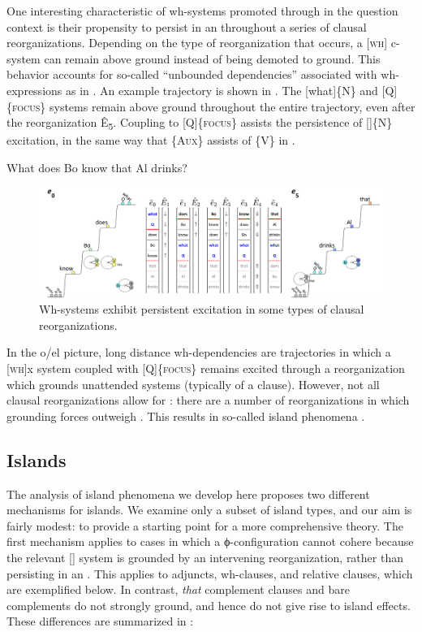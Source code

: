   One interesting characteristic of wh-systems promoted through  in the question context is their propensity to persist in an  throughout a series of clausal reorganizations. Depending on the type of reorganization that occurs, a [\textsc{wh}] c-system can remain above ground instead of being demoted to ground. This behavior accounts for so-called “unbounded dependencies” associated with wh-expressions as in . An example trajectory is shown in {}. The [what]\{N\} and [Q]\{\textsc{focus}\} systems remain above ground throughout the entire trajectory, even after the  reorganization Ê\textsubscript{5}. Coupling to [Q]\{\textsc{focus}\} assists the persistence of []\{N\} excitation, in the same way that \{A\textsc{ux}\} assists  of \{V\} in . 

  \ea\label{ex:7:20}
    {What does Bo know that Al drinks?}
\z
  
\begin{figure}
\includegraphics[width=\textwidth]{figures/Tilsen-img162.png}
\caption{Wh-systems exhibit persistent excitation in some types of clausal reorganizations.}
\label{fig:7:18}
\end{figure}
 

  In the o/el picture, long distance wh-dependencies are trajectories in which a [\textsc{wh}]{x} system coupled with [Q]\{\textsc{focus}\} remains excited through a reorganization which grounds unattended systems (typically of a clause). However, not all clausal reorganizations allow for : there are a number of reorganizations in which grounding forces outweigh . This results in so-called island phenomena \citep{Ross1967}.

\subsection{Islands}

The analysis of island phenomena we develop here proposes two different mechanisms for islands. We examine only a subset of island types, and our aim is fairly modest: to provide a starting point for a more comprehensive theory. The first mechanism applies to cases in which a ϕ-con\-fig\-u\-ra\-tion cannot cohere because the relevant [\textsc{}] system is grounded by an intervening reorganization, rather than persisting in an . This applies to adjuncts, wh-clauses, and relative clauses, which are exemplified below. In contrast, \textit{that} complement clauses and bare complements do not strongly ground, and hence do not give rise to island effects. These differences are summarized in {}:

